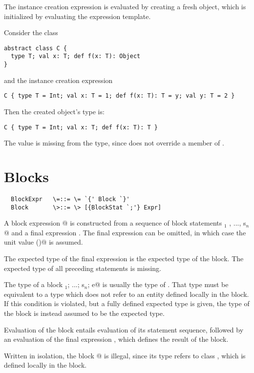 \documentclass[11pt]{report}
\begin{document}
The instance creation expression is evaluated by creating a fresh
object, which is initialized by evaluating the expression template.

\example Consider the class
\begin{verbatim}
abstract class C {
  type T; val x: T; def f(x: T): Object
}
\end{verbatim}
and the instance creation expression
\begin{verbatim}
C { type T = Int; val x: T = 1; def f(x: T): T = y; val y: T = 2 }
\end{verbatim}
Then the created object's type is:
\begin{verbatim}
C { type T = Int; val x: T; def f(x: T): T }
\end{verbatim}
The value \verb@y@ is missing from the type, since \verb@y@ does not
override a member of \verb@C@.

\section{Blocks}
\label{sec:blocks}

\syntax\begin{verbatim}
  BlockExpr   \=::= \= `{' Block `}'
  Block       \>::= \> [{BlockStat `;'} Expr]
\end{verbatim}

A block expression @ is constructed from a
sequence of block statements \verb@s$_1$ , ..., s$_n$@ and a final
expression \verb@e@. The final expression can be omitted, in which
case the unit value \verb@()@ is assumed.


The expected type of the final expression \verb@e@ is the expected
type of the block. The expected type of all preceding statements is
missing.

The type of a block \verb@s$_1$; ...; s$_n$; e@ is usually the type of
\verb@e@.  That type must be equivalent to a type which does not refer
to an entity defined locally in the block. If this condition is
violated, but a fully defined expected type is given, the type of the
block is instead assumed to be the expected type.

Evaluation of the block entails evaluation of its statement sequence,
followed by an evaluation of the final expression \verb@e@, which
defines the result of the block.

\example
Written in isolation, 
the block @ is illegal, since its type
refers to class \verb@C@, which is defined locally in the block.
\end{document}
